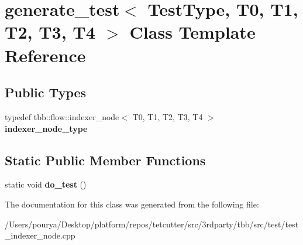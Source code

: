 \hypertarget{classgenerate__test_3_01TestType_00_01T0_00_01T1_00_01T2_00_01T3_00_01T4_01_4}{}\section{generate\+\_\+test$<$ Test\+Type, T0, T1, T2, T3, T4 $>$ Class Template Reference}
\label{classgenerate__test_3_01TestType_00_01T0_00_01T1_00_01T2_00_01T3_00_01T4_01_4}
\subsection*{Public Types}
\begin{DoxyCompactItemize}
\item 
\hypertarget{classgenerate__test_3_01TestType_00_01T0_00_01T1_00_01T2_00_01T3_00_01T4_01_4_a7cd54b92f6011375056ffaef78475ca9}{}typedef tbb\+::flow\+::indexer\+\_\+node$<$ T0, T1, T2, T3, T4 $>$ {\bfseries indexer\+\_\+node\+\_\+type}\label{classgenerate__test_3_01TestType_00_01T0_00_01T1_00_01T2_00_01T3_00_01T4_01_4_a7cd54b92f6011375056ffaef78475ca9}

\end{DoxyCompactItemize}
\subsection*{Static Public Member Functions}
\begin{DoxyCompactItemize}
\item 
\hypertarget{classgenerate__test_3_01TestType_00_01T0_00_01T1_00_01T2_00_01T3_00_01T4_01_4_af2c007f68aca1c668a613e4b6f6516a3}{}static void {\bfseries do\+\_\+test} ()\label{classgenerate__test_3_01TestType_00_01T0_00_01T1_00_01T2_00_01T3_00_01T4_01_4_af2c007f68aca1c668a613e4b6f6516a3}

\end{DoxyCompactItemize}


The documentation for this class was generated from the following file\+:\begin{DoxyCompactItemize}
\item 
/\+Users/pourya/\+Desktop/platform/repos/tetcutter/src/3rdparty/tbb/src/test/test\+\_\+indexer\+\_\+node.\+cpp\end{DoxyCompactItemize}
